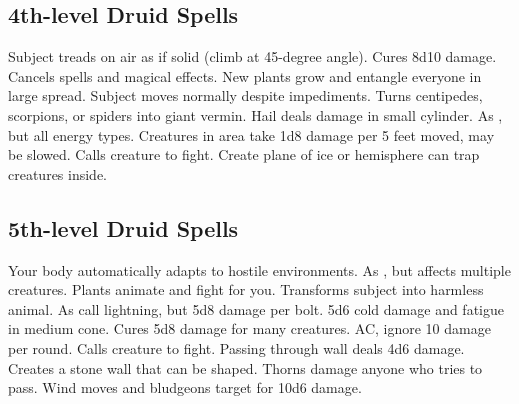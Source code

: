 \subsection{4th-level Druid Spells}
\begin{spelllist}
 Subject treads on air as if solid (climb at 45-degree angle).
 Cures 8d10 damage.
 Cancels spells and magical effects.
 New plants grow and entangle everyone in large spread.
 Subject moves normally despite impediments.
 Turns centipedes, scorpions, or spiders into giant vermin.
 Hail deals damage in small cylinder.
 As , but all energy types.
 Creatures in area take 1d8 damage per 5 feet moved, may be slowed.
 Calls creature to fight.
 Create plane of ice or hemisphere can trap creatures inside.
\end{spelllist}

\subsection{5th-level Druid Spells}
\begin{spelllist}
 Your body automatically adapts to hostile environments.
 As , but affects multiple creatures.
 Plants animate and fight for you.
 Transforms subject into harmless animal.
 As call lightning, but 5d8 damage per bolt.
 5d6 cold damage and fatigue in medium cone.
 Cures 5d8 damage for many creatures.
  AC, ignore 10 damage per round.
 Calls creature to fight.
 Passing through wall deals 4d6 damage.
 Creates a stone wall that can be shaped.
 Thorns damage anyone who tries to pass.
 Wind moves and bludgeons target for 10d6 damage.
\end{spelllist}

